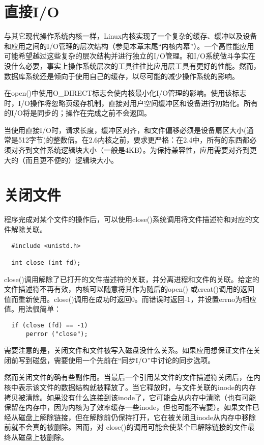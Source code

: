 \section{直接I/O}

与其它现代操作系统内核一样，Linux内核实现了一个复杂的缓存、缓冲以及设备和应用之间的I/O管理的层次结构（参见本章末尾“内核内幕”）。一个高性能应用可能希望越过这些复杂的层次结构并进行独立的I/O管理。和I/O系统做斗争实在没什么必要，事实上操作系统层次的工具往往比应用层工具有更好的性能。然而，数据库系统还是倾向于使用自己的缓存，以尽可能的减少操作系统的影响。

在open()中使用O\_DIRECT标志会使内核最小化I/O管理的影响。使用该标志时，I/O操作将忽略页缓存机制，直接对用户空间缓冲区和设备进行初始化。所有的I/O将是同步的；操作在完成之前不会返回。

当使用直接I/O时，请求长度，缓冲区对齐，和文件偏移必须是设备扇区大小(通常是512字节)的整数倍。在2.6内核之前，要求更严格：在2.4中，所有的东西都必须对齐到文件系统逻辑块大小（一般是4KB）。为保持兼容性，应用需要对齐到更大的（而且更不便的）逻辑块大小。

\section{关闭文件}

程序完成对某个文件的操作后，可以使用close()系统调用将文件描述符和对应的文件解除关联。

\begin{lstlisting}
  #include <unistd.h>

  int close (int fd);
\end{lstlisting}

close()调用解除了已打开的文件描述符的关联，并分离进程和文件的关联。给定的文件描述符不再有效，内核可以随意将其作为随后的open() 或creat()调用的返回值而重新使用。close()调用在成功时返回0。而错误时返回-1，并设置errno为相应值。用法很简单：

\begin{lstlisting}
  if (close (fd) == -1)
      perror ("close");
\end{lstlisting}

需要注意的是，关闭文件和文件被写入磁盘没什么关系。如果应用想保证文件在关闭前写到磁盘，需要使用一个先前在“同步I/O”中讨论的同步选项。

然而关闭文件的确有些副作用。当最后一个引用某文件的文件描述符关闭后，在内核中表示该文件的数据结构就被释放了。当它释放时，与文件关联的inode的内存拷贝被清除。如果没有什么连接到该inode了，它可能会从内存中清除（也有可能保留在内存中，因为内核为了效率缓存一些inode，但也可能不需要）。如果文件已经从磁盘上解除链接，但在解除前仍保持打开，它在被关闭且inode从内存中移除前就不会真的被删除。因而，对 close()的调用可能会使某个已解除链接的文件最终从磁盘上被删除。

